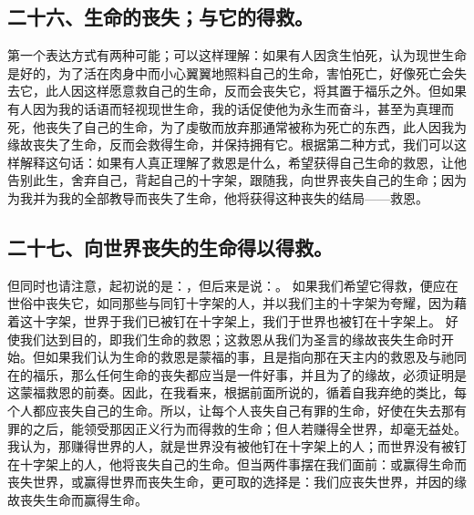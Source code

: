 
\subsection{二十六、生命的丧失；与它的得救。}

第一个表达方式有两种可能；可以这样理解：如果有人因贪生怕死，认为现世生命是好的，为了活在肉身中而小心翼翼地照料自己的生命，害怕死亡，好像死亡会失去它，此人因这样愿意救自己的生命，反而会丧失它，将其置于福乐之外。但如果有人因为我的话语而轻视现世生命，我的话促使他为永生而奋斗，甚至为真理而死，他丧失了自己的生命，为了虔敬而放弃那通常被称为死亡的东西，此人因我为缘故丧失了生命，反而会救得生命，并保持拥有它。根据第二种方式，我们可以这样解释这句话：如果有人真正理解了救恩是什么，希望获得自己生命的救恩，让他告别此生，舍弃自己，背起自己的十字架，跟随我，向世界丧失自己的生命；因为为我并为我的全部教导而丧失了生命，他将获得这种丧失的结局——救恩。\par


\subsection{二十七、向世界丧失的生命得以得救。}

但同时也请注意，起初说的是：，但后来是说：。 如果我们希望它得救，便应在世俗中丧失它，如同那些与同钉十字架的人，并以我们主的十字架为夸耀，因为藉着这十字架，世界于我们已被钉在十字架上，我们于世界也被钉在十字架上。 好使我们达到目的，即我们生命的救恩；这救恩从我们为圣言的缘故丧失生命时开始。但如果我们认为生命的救恩是蒙福的事，且是指向那在天主内的救恩及与祂同在的福乐，那么任何生命的丧失都应当是一件好事，并且为了的缘故，必须证明是这蒙福救恩的前奏。因此，在我看来，根据前面所说的，循着自我弃绝的类比，每个人都应丧失自己的生命。所以，让每个人丧失自己有罪的生命，好使在失去那有罪的之后，能领受那因正义行为而得救的生命；但人若赚得全世界，却毫无益处。我认为，那赚得世界的人，就是世界没有被他钉在十字架上的人；而世界没有被钉在十字架上的人，他将丧失自己的生命。但当两件事摆在我们面前：或赢得生命而丧失世界，或赢得世界而丧失生命，更可取的选择是：我们应丧失世界，并因的缘故丧失生命而赢得生命。\par

